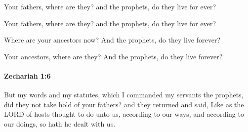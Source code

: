 			Your fathers, where are they? and the prophets, do they live for ever?

			\begin{versebox}
					\item[BHS] 
					\item[LXX] 
					\item[ASV] Your fathers, where are they? and the prophets, do they live for ever?
					\item[NIV] Where are your ancestors now? And the prophets, do they live forever?
					\item[NRSV] Your ancestors, where are they? And the prophets, do they live forever?
			\end{versebox}

		\paragraph{Zechariah 1:6} %
			\label{ZECHARIAH-1-6}

			But my words and my statutes, which I commanded my servants the prophets, did they not take hold of your fathers? and they returned and said, Like as the LORD of hosts thought to do unto us, according to our ways, and according to our doings, so hath he dealt with us.

